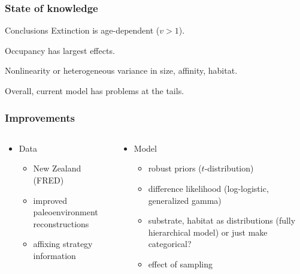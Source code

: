 \documentclass{beamer}
\begin{document}
\begin{frame}
  \frametitle{State of knowledge}

  \begin{block}{Conclusions}
    Extinction is age-dependent (\(v > 1\)).

    Occupancy has largest effects.

    Nonlinearity or heterogeneous variance in size, affinity, habitat.

    Overall, current model has problems at the tails.
  \end{block}
\end{frame}


\begin{frame}
  \frametitle{Improvements}
  \begin{columns}
    \begin{column}{0.5\textwidth}
      \begin{itemize}
        \item Data
          \begin{itemize}
            \item New Zealand (FRED)
            \item improved paleoenvironment reconstructions
            \item affixing strategy information
          \end{itemize}
      \end{itemize}
    \end{column}
    \begin{column}{0.5\textwidth}
      \begin{itemize}
        \item Model
          \begin{itemize}
            \item robust priors (\(t\)-distribution)
            \item difference likelihood (log-logistic, generalized gamma)
            \item substrate, habitat as distributions (fully hierarchical model) or just make categorical?
            \item effect of sampling 
          \end{itemize}
      \end{itemize}
    \end{column}
  \end{columns}
\end{frame}
\end{document}
